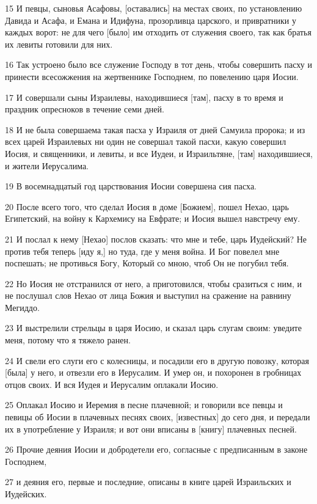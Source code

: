\par 15 И певцы, сыновья Асафовы, [оставались] на местах своих, по установлению Давида и Асафа, и Емана и Идифуна, прозорливца царского, и привратники у каждых ворот: не для чего [было] им отходить от служения своего, так как братья их левиты готовили для них.
\par 16 Так устроено было все служение Господу в тот день, чтобы совершить пасху и принести всесожжения на жертвеннике Господнем, по повелению царя Иосии.
\par 17 И совершали сыны Израилевы, находившиеся [там], пасху в то время и праздник опресноков в течение семи дней.
\par 18 И не была совершаема такая пасха у Израиля от дней Самуила пророка; и из всех царей Израилевых ни один не совершал такой пасхи, какую совершил Иосия, и священники, и левиты, и все Иудеи, и Израильтяне, [там] находившиеся, и жители Иерусалима.
\par 19 В восемнадцатый год царствования Иосии совершена сия пасха.
\par 20 После всего того, что сделал Иосия в доме [Божием], пошел Нехао, царь Египетский, на войну к Кархемису на Евфрате; и Иосия вышел навстречу ему.
\par 21 И послал к нему [Нехао] послов сказать: что мне и тебе, царь Иудейский? Не против тебя теперь [иду я,] но туда, где у меня война. И Бог повелел мне поспешать; не противься Богу, Который со мною, чтоб Он не погубил тебя.
\par 22 Но Иосия не отстранился от него, а приготовился, чтобы сразиться с ним, и не послушал слов Нехао от лица Божия и выступил на сражение на равнину Мегиддо.
\par 23 И выстрелили стрельцы в царя Иосию, и сказал царь слугам своим: уведите меня, потому что я тяжело ранен.
\par 24 И свели его слуги его с колесницы, и посадили его в другую повозку, которая [была] у него, и отвезли его в Иерусалим. И умер он, и похоронен в гробницах отцов своих. И вся Иудея и Иерусалим оплакали Иосию.
\par 25 Оплакал Иосию и Иеремия в песне плачевной; и говорили все певцы и певицы об Иосии в плачевных песнях своих, [известных] до сего дня, и передали их в употребление у Израиля; и вот они вписаны в [книгу] плачевных песней.
\par 26 Прочие деяния Иосии и добродетели его, согласные с предписанным в законе Господнем,
\par 27 и деяния его, первые и последние, описаны в книге царей Израильских и Иудейских.

